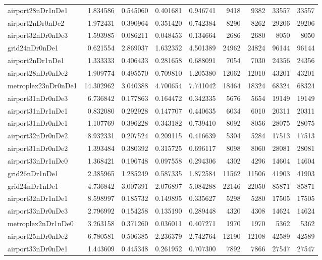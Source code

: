 \begin{longtable}{|l|r|r|r|r|r|r|r|r|}
airport28nDr1nDe1 & 1.834586 & 0.545060 & 0.401681 & 0.946741 & 9418 & 9382 & 33557 & 33557 \\
airport2nDr0nDe2 & 1.972431 & 0.390964 & 0.351420 & 0.742384 & 8290 & 8262 & 29206 & 29206 \\
airport32nDr0nDe3 & 1.593985 & 0.086211 & 0.048453 & 0.134664 & 2686 & 2680 & 8050 & 8050 \\
grid24nDr0nDe1 & 0.621554 & 2.869037 & 1.632352 & 4.501389 & 24962 & 24824 & 96144 & 96144 \\
airport2nDr1nDe1 & 1.333333 & 0.406433 & 0.281658 & 0.688091 & 7054 & 7030 & 24356 & 24356 \\
airport28nDr0nDe2 & 1.909774 & 0.495570 & 0.709810 & 1.205380 & 12062 & 12010 & 43201 & 43201 \\
metroplex23nDr0nDe1 & 14.302962 & 3.040388 & 4.700654 & 7.741042 & 18464 & 18324 & 68324 & 68324 \\
airport31nDr0nDe3 & 6.736842 & 0.177863 & 0.164472 & 0.342335 & 5676 & 5654 & 19149 & 19149 \\
airport31nDr1nDe1 & 0.832080 & 0.292928 & 0.147707 & 0.440635 & 6034 & 6010 & 20311 & 20311 \\
airport31nDr0nDe1 & 1.107769 & 0.396228 & 0.343182 & 0.739410 & 8092 & 8056 & 28075 & 28075 \\
airport32nDr0nDe2 & 8.932331 & 0.207524 & 0.209115 & 0.416639 & 5304 & 5284 & 17513 & 17513 \\
airport31nDr0nDe2 & 1.393484 & 0.380392 & 0.315725 & 0.696117 & 8098 & 8060 & 28081 & 28081 \\
airport33nDr1nDe0 & 1.368421 & 0.196748 & 0.097558 & 0.294306 & 4302 & 4296 & 14604 & 14604 \\
grid26nDr1nDe1 & 2.385965 & 1.285249 & 0.587335 & 1.872584 & 11562 & 11506 & 41903 & 41903 \\
grid24nDr1nDe1 & 4.736842 & 3.007391 & 2.076897 & 5.084288 & 22146 & 22050 & 85871 & 85871 \\
airport32nDr1nDe1 & 8.598997 & 0.185732 & 0.149895 & 0.335627 & 5298 & 5280 & 17505 & 17505 \\
airport33nDr0nDe3 & 2.796992 & 0.154258 & 0.135190 & 0.289448 & 4320 & 4308 & 14624 & 14624 \\
metroplex2nDr1nDe0 & 3.263158 & 0.371260 & 0.036011 & 0.407271 & 1970 & 1970 & 5362 & 5362 \\
airport25nDr0nDe2 & 6.780581 & 0.506385 & 2.236379 & 2.742764 & 12190 & 12108 & 42589 & 42589 \\
airport33nDr0nDe1 & 1.443609 & 0.445348 & 0.261952 & 0.707300 & 7892 & 7866 & 27547 & 27547 \\

\end{longtable}
